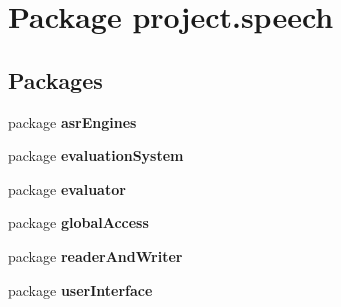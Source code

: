 \section{Package project.\+speech}
\label{namespaceproject_1_1speech}
\subsection*{Packages}
\begin{DoxyCompactItemize}
\item 
package {\bf asr\+Engines}
\item 
package {\bf evaluation\+System}
\item 
package {\bf evaluator}
\item 
package {\bf global\+Access}
\item 
package {\bf reader\+And\+Writer}
\item 
package {\bf user\+Interface}
\end{DoxyCompactItemize}
